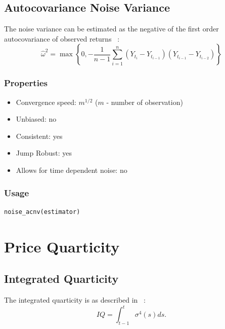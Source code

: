 \documentclass[letterpaper]{report}
\newcounter{N}
\begin{document}
\section{Autocovariance Noise Variance}
The noise variance can be estimated as the negative of the first order autocovariance of observed returns ~\cite[Oomen, 2005]{Oomen}:
\begin{equation}
\label{AC_Variance}
\hat{\omega}^2=\max \left\{0, -\frac{1}{n-1}\sum_{i=1}^{n} (Y_{t_i} - Y_{t_{i-1}})(Y_{t_{i-1}} - Y_{t_{i-2}})\right\}
\end{equation}
\subsection{Properties}
\begin{itemize}
\item Convergence speed: $m^{1/2}$ ($m$ - number of observation)
\item Unbiased: no
\item Consistent: yes
\item Jump Robust: yes
\item Allows for time dependent noise: no
\end{itemize}
  \subsection{Usage}
\begin{lstlisting}
noise_acnv(estimator)
\end{lstlisting}

\chapter{Price Quarticity}

\section{Integrated Quarticity}
The integrated quarticity is as described in ~\cite[Pigorsch et al.]{Pigorsch_Pigorsch_Popov}:
\begin{equation}
IQ = \int_{t-1}^t \sigma^4(s)ds.
\end{equation}
\end{document}
